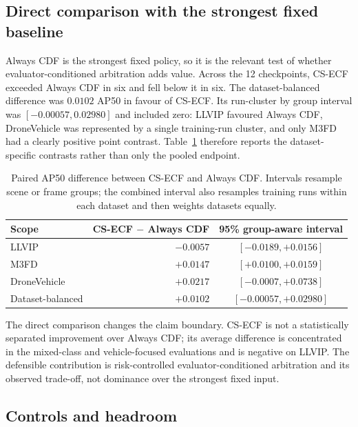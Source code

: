 \documentclass[preprint,11pt]{elsarticle}
\begin{document}
\subsection{Direct comparison with the strongest fixed baseline}

Always CDF is the strongest fixed policy, so it is the relevant test of whether
evaluator-conditioned arbitration adds value. Across the 12 checkpoints, CS-ECF
exceeded Always CDF in six and fell below it in six. The dataset-balanced
difference was \(0.0102\) AP50 in favour of CS-ECF. Its run-cluster by group
interval was \([-0.00057,0.02980]\) and included zero: LLVIP favoured Always
CDF, DroneVehicle was represented by a single training-run cluster, and only
M3FD had a clearly positive point contrast. Table~\ref{tab:cdf-paired} therefore
reports the dataset-specific contrasts rather than only the pooled endpoint.

\begin{table}[t]
\centering
\small
\caption{Paired AP50 difference between CS-ECF and Always CDF. Intervals
resample scene or frame groups; the combined interval also resamples training
runs within each dataset and then weights datasets equally.}
\label{tab:cdf-paired}
\begin{tabular}{@{}lrc@{}}
\toprule
Scope & CS-ECF \(-\) Always CDF & 95\% group-aware interval \\
\midrule
LLVIP & \(-0.0057\) & \([-0.0189,+0.0156]\) \\
M3FD & \(+0.0147\) & \([+0.0100,+0.0159]\) \\
DroneVehicle & \(+0.0217\) & \([-0.0007,+0.0738]\) \\
Dataset-balanced & \(+0.0102\) & \([-0.00057,+0.02980]\) \\
\bottomrule
\end{tabular}
\end{table}

The direct comparison changes the claim boundary. CS-ECF is not a statistically
separated improvement over Always CDF; its average difference is concentrated
in the mixed-class and vehicle-focused evaluations and is negative on LLVIP.
The defensible contribution is risk-controlled evaluator-conditioned
arbitration and its observed trade-off, not dominance over the strongest fixed
input.

\subsection{Controls and headroom}
\end{document}
